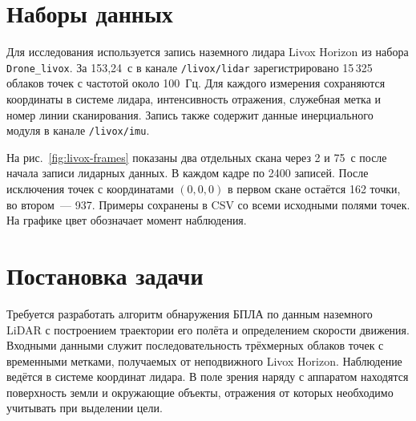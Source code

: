 \documentclass{misisarticle}
\begin{document}
\section{Наборы данных}

Для исследования используется запись наземного лидара Livox Horizon из набора \texttt{Drone\_livox}. За 153{,}24~с в канале \texttt{/livox/lidar} зарегистрировано 15\,325 облаков точек с частотой около 100~Гц. Для каждого измерения сохраняются координаты в системе лидара, интенсивность отражения, служебная метка и номер линии сканирования. Запись также содержит данные инерциального модуля в канале \texttt{/livox/imu}.

На рис.~\ref{fig:livox-frames} показаны два отдельных скана через 2 и 75~с после начала записи лидарных данных. В каждом кадре по 2400 записей. После исключения точек с координатами $(0,0,0)$ в первом скане остаётся 162 точки, во втором~--- 937. Примеры сохранены в CSV со всеми исходными полями точек. На графике цвет обозначает момент наблюдения.

\noindent\begin{minipage}{\columnwidth}
  \centering
  \label{fig:livox-frames}
\end{minipage}\par

\section{Постановка задачи}

Требуется разработать алгоритм обнаружения БПЛА по данным наземного LiDAR с построением траектории его полёта и определением скорости движения. Входными данными служит последовательность трёхмерных облаков точек с временными метками, получаемых от неподвижного Livox Horizon. Наблюдение ведётся в системе координат лидара. В поле зрения наряду с аппаратом находятся поверхность земли и окружающие объекты, отражения от которых необходимо учитывать при выделении цели.
\end{document}
